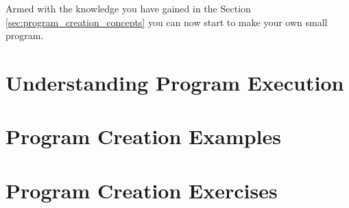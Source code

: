Armed with the knowledge you have gained in the Section \ref{sec:program_creation_concepts} you can now start to make your own small program.










\cleardoublepage
\def\pageLang{none}
\section{Understanding Program Execution} %
\label{sec:understanding_program_execution}




\clearpage
\section{Program Creation Examples} %
\label{sec:program_creation_examples}




\clearpage
\section{Program Creation Exercises} %
\label{sec:program_creation_exercises}




% 

